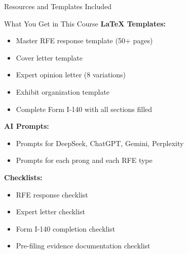 \documentclass[11pt]{beamer}
\begin{document}
	\begin{frame}{Resources and Templates Included}
		\scriptsize
		\begin{block}{What You Get in This Course}
			\textbf{LaTeX Templates:}
			\begin{itemize}
				\item Master RFE response template (50+ pages)
				\item Cover letter template
				\item Expert opinion letter (8 variations)
				\item Exhibit organization template
				\item Complete Form I-140 with all sections filled
			\end{itemize}
			\textbf{AI Prompts:}
			\begin{itemize}
				\item Prompts for DeepSeek, ChatGPT, Gemini, Perplexity
				\item Prompts for each prong and each RFE type
			\end{itemize}
			\textbf{Checklists:}
			\begin{itemize}
				\item RFE response checklist
				\item Expert letter checklist
				\item Form I-140 completion checklist
				\item Pre-filing evidence documentation checklist
			\end{itemize}
		\end{block}
	\end{frame}
	
	
\end{document}
